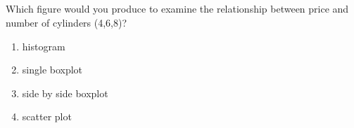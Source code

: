 \subsection{}
\begin{frame}
\end{frame}


\begin{frame}
\begin{clicker}{Which figure would you produce to examine the relationship between price and number of cylinders (4,6,8)?}
\begin{enumerate}
\item histogram
\item single boxplot
\item side by side boxplot
\item scatter plot
\end{enumerate}
\end{clicker}
\end{frame}




